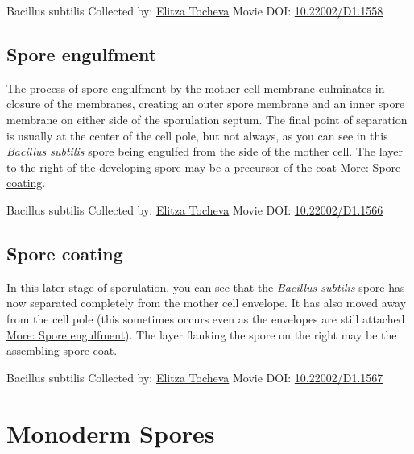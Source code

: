 \documentclass[]{tufte-book}
\begin{document}
\label{fig:8-6}Bacillus subtilis Collected by: \protect\hyperlink{elitza_tocheva}{Elitza Tocheva} Movie DOI: \href{https://doi.org/10.22002/D1.1558}{10.22002/D1.1558}

\hypertarget{Spore_engulfment}{%
\subsection{Spore engulfment}\label{Spore_engulfment}}

The process of spore engulfment by the mother cell membrane culminates in closure of the membranes, creating an outer spore membrane and an inner spore membrane on either side of the sporulation septum. The final point of separation is usually at the center of the cell pole, but not always, as you can see in this \emph{Bacillus subtilis} spore being engulfed from the side of the mother cell. The layer to the right of the developing spore may be a precursor of the coat \protect\hyperlink{Spore_coating}{More: Spore coating}.



\hypertarget{htmlwidget-7dbffb5f4f77854444cf}{}

\label{fig:8-6a}Bacillus subtilis Collected by: \protect\hyperlink{elitza_tocheva}{Elitza Tocheva} Movie DOI: \href{https://doi.org/10.22002/D1.1566}{10.22002/D1.1566}

\hypertarget{Spore_coating}{%
\subsection{Spore coating}\label{Spore_coating}}

In this later stage of sporulation, you can see that the \emph{Bacillus subtilis} spore has now separated completely from the mother cell envelope. It has also moved away from the cell pole (this sometimes occurs even as the envelopes are still attached \protect\hyperlink{Spore_engulfment}{More: Spore engulfment}). The layer flanking the spore on the right may be the assembling spore coat.



\hypertarget{htmlwidget-2a54c5056b292d7f6fc2}{}

\label{fig:8-6b}Bacillus subtilis Collected by: \protect\hyperlink{elitza_tocheva}{Elitza Tocheva} Movie DOI: \href{https://doi.org/10.22002/D1.1567}{10.22002/D1.1567}

\hypertarget{monoderm-spores}{%
\section{Monoderm Spores}\label{monoderm-spores}}
\end{document}
